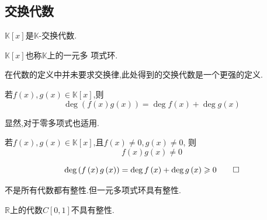 \subsection{交换代数}
\begin{green}
\begin{corollary}[交换代数]\label{cor:交换代数}
    $\mathbb{K}\left[x\right]$是$\mathbb{K}$-交换代数.
\end{corollary}
\end{green}
\begin{green}
\begin{corollary}[环]\label{cor:环}
    $\mathbb{K}\left[x\right]$也称$\mathbb{K}$上的一元多
    项式环.
\end{corollary}
\end{green}
\begin{red}
\begin{remark}
    在代数的定义中并未要求交换律,此处得到的交换代数是一个更强的定义.
\end{remark}
\end{red}
\begin{formal}
\begin{proposition}[积的次数]\label{prop:积的次数}
    若$f\left(x\right),g\left(x\right)\in \mathbb{K}\left[x\right]$,则\[
    \deg \left(f\left(x\right)g\left(x\right)\right)=\deg f\left(x\right)+\deg g\left(x\right)
    \]
\end{proposition}
\begin{Proof}
显然,对于零多项式也适用.
\end{Proof}
\end{formal}
\begin{green}
\begin{corollary}[一元多项式环的整性]\label{cor:一元多项式环的整性}
        若$f\left(x\right),g\left(x\right)\in \mathbb{K}\left[x\right]$,且$f\left(x\right)\neq 0,g\left(x\right)\neq 0$,
        则
        \[
        f\left(x\right)g\left(x\right)\neq 0
        \]
\end{corollary}
\begin{Proof}
\[
\deg \left(f\left(x\right)g\left(x\right)\right)=\deg f\left(x\right)+\deg g\left(x\right)\geqslant 0
\qedhere
\]
\end{Proof}
\end{green}
\begin{red}
\begin{remark}
    不是所有代数都有整性.但一元多项式环具有整性.
\end{remark}
\end{red}
\begin{brown}
\begin{example}
    $\mathbb{R}$上的代数$C\left[0,1\right]$不具有整性.
\end{example}
\end{brown}
